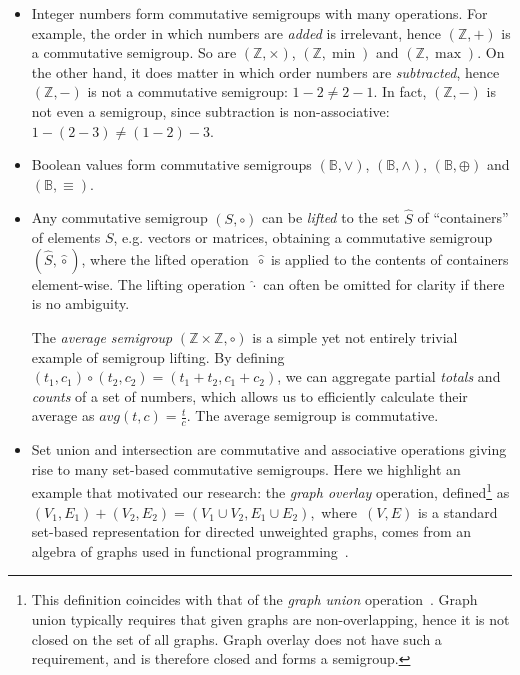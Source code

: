 \begin{itemize}
  \item Integer numbers form commutative semigroups with many operations. For
  example, the order in which numbers are \emph{added} is irrelevant, hence
  $(\mathbb{Z}, +)$ is a commutative semigroup. So are $(\mathbb{Z}, \times)$,
  $(\mathbb{Z}, \min)$ and $(\mathbb{Z}, \max)$. On the other hand, it does
  matter in which order numbers are \emph{subtracted}, hence $(\mathbb{Z}, -)$
  is not a commutative semigroup: $1-2 \neq 2-1$. In fact, $(\mathbb{Z}, -)$
  is not even a semigroup, since subtraction is non-associative:
  $1-(2-3) \neq (1-2)-3$.

  \item Boolean values form commutative semigroups $(\mathbb{B}, \vee)$,
  $(\mathbb{B}, \wedge)$, $(\mathbb{B}, \oplus)$ and $(\mathbb{B}, \equiv)$.

  \item Any commutative semigroup $(S, \circ)$ can be \emph{lifted} to the set
  $\hat{S}$ of ``containers'' of elements $S$, e.g. vectors or matrices,
  obtaining a commutative semigroup $(\hat{S}, \hat{\circ})$, where the lifted
  operation~$\hat{\circ}$ is applied to the contents of containers element-wise.
  The lifting operation $\hat{\cdot}$ can often be omitted for clarity if there
  is no ambiguity.

  The \emph{average semigroup} $(\mathbb{Z} \times \mathbb{Z}, \circ)$ is a
  simple yet not entirely trivial example of semigroup lifting. By defining
  $(t_1, c_1) \circ (t_2, c_2) = (t_1 + t_2, c_1 + c_2)$, we can aggregate
  partial \emph{totals} and \emph{counts} of a set of numbers, which allows us
  to efficiently calculate their average as $\textit{avg}(t, c) = \frac{t}{c}$.
  The average semigroup is commutative.

  \item Set union and intersection are commutative and associative operations
  giving rise to many set-based commutative semigroups. Here we highlight an
  example that motivated our research: the \emph{graph overlay} operation,
  defined\footnote{This definition coincides with that of the
  \emph{graph union} operation~\cite{1969_graph_theory_harary}. Graph union
  typically requires that given graphs are non-overlapping, hence it is not
  closed on the set of all graphs. Graph overlay does not have such a
  requirement, and is therefore closed and forms a semigroup.} as
  $(V_1, E_1) + (V_2, E_2) = (V_1 \cup V_2, E_1 \cup E_2)$,~where~$(V, E)$ is
  a standard set-based representation for directed unweighted graphs, comes from
  an algebra of graphs used in functional programming~\cite{mokhov2017algebraic}.
\end{itemize}

